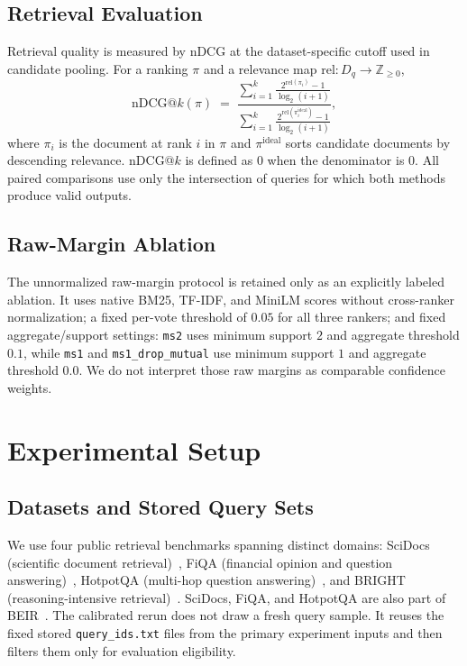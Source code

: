 \documentclass[manuscript,anonymous,review]{acmart}
\begin{document}
\subsection{Retrieval Evaluation}
\label{sec:retrieval-metrics}

Retrieval quality is measured by nDCG at the dataset-specific cutoff used in
candidate pooling. For a ranking $\pi$ and a relevance map $\mathrm{rel}:D_q
\to \mathbb{Z}_{\ge 0}$,
\begin{equation}
  \mathrm{nDCG@}k(\pi) \;=\; \frac{\displaystyle\sum_{i=1}^{k} \frac{2^{\mathrm{rel}(\pi_i)}-1}{\log_2(i+1)}}
  {\displaystyle\sum_{i=1}^{k} \frac{2^{\mathrm{rel}(\pi_i^{\mathrm{ideal}})}-1}{\log_2(i+1)}},
  \label{eq:ndcg}
\end{equation}
where $\pi_i$ is the document at rank $i$ in $\pi$ and $\pi^{\mathrm{ideal}}$
sorts candidate documents by descending relevance. nDCG@$k$ is defined as $0$
when the denominator is $0$. All paired comparisons use only the intersection
of queries for which both methods produce valid outputs.

\subsection{Raw-Margin Ablation}

The unnormalized raw-margin protocol is retained only as an explicitly labeled
ablation. It uses native BM25, TF-IDF, and MiniLM scores without cross-ranker
normalization; a fixed per-vote threshold of $0.05$ for all three rankers; and
fixed aggregate/support settings: \texttt{ms2} uses minimum support $2$ and
aggregate threshold $0.1$, while \texttt{ms1} and
\texttt{ms1\_drop\_mutual} use minimum support $1$ and aggregate threshold
$0.0$. We do not interpret those raw margins as comparable confidence weights.

\section{Experimental Setup}
\label{sec:experimental-setup}

\subsection{Datasets and Stored Query Sets}
\label{sec:datasets}

We use four public retrieval benchmarks spanning distinct domains: SciDocs
(scientific document retrieval)~\cite{cohan2020scidocs}, FiQA (financial
opinion and question answering)~\cite{maia2018fiqa}, HotpotQA (multi-hop
question answering)~\cite{yang2018hotpotqa}, and BRIGHT (reasoning-intensive
retrieval)~\cite{su2024bright}. SciDocs, FiQA, and HotpotQA are also part of
BEIR~\cite{thakur2021beir}. The calibrated rerun does not draw a fresh query
sample. It reuses the fixed stored \texttt{query\_ids.txt} files from the
primary experiment inputs and then filters them only for evaluation
eligibility.
\end{document}
